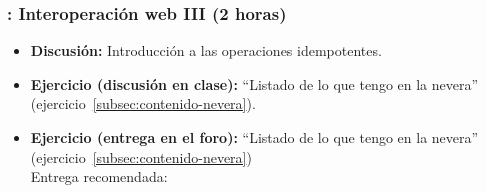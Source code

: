 \documentclass[a4paper,12pt]{article}
\begin{document}
\subsubsection{\juevesI: Interoperación web III (2 horas)}
\label{cal:juevesI}

\begin{itemize}
\item \textbf{Discusión:} Introducción a las operaciones idempotentes.
\item \textbf{Ejercicio (discusión en clase):} ``Listado de lo que tengo en la nevera'' (ejercicio~\ref{subsec:contenido-nevera}).  
\item \textbf{Ejercicio (entrega en el foro):} ``Listado de lo que tengo en la nevera'' (ejercicio~\ref{subsec:contenido-nevera}) \\
  Entrega recomendada: \juevesJ
\end{itemize}





\end{document}
